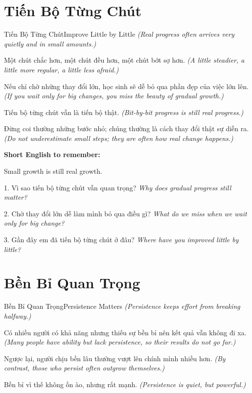 \section{Tiến Bộ Từng Chút}
\begin{truyen}{Tiến Bộ Từng Chút}{Improve Little by Little}
\textit{(Real progress often arrives very quietly and in small amounts.)}

Một chút chắc hơn, một chút đều hơn, một chút bớt sợ hơn.
\textit{(A little steadier, a little more regular, a little less afraid.)}

Nếu chỉ chờ những thay đổi lớn, học sinh sẽ dễ bỏ qua phần đẹp của việc lớn lên.
\textit{(If you wait only for big changes, you miss the beauty of gradual growth.)}

Tiến bộ từng chút vẫn là tiến bộ thật.
\textit{(Bit-by-bit progress is still real progress.)}
\end{truyen}

\begin{baihoc}
Đừng coi thường những bước nhỏ; chúng thường là cách thay đổi thật sự diễn ra.
\textit{(Do not underestimate small steps; they are often how real change happens.)}
\end{baihoc}

\begin{ghinhoanh}
\textbf{Short English to remember:}

Small growth is still real growth.

\end{ghinhoanh}

\begin{tuhocnhanh}
1. Vì sao tiến bộ từng chút vẫn quan trọng? \textit{Why does gradual progress still matter?}

2. Chờ thay đổi lớn dễ làm mình bỏ qua điều gì? \textit{What do we miss when we wait only for big change?}

3. Gần đây em đã tiến bộ từng chút ở đâu? \textit{Where have you improved little by little?}
\end{tuhocnhanh}
\ngancach

\section{Bền Bỉ Quan Trọng}
\begin{truyen}{Bền Bỉ Quan Trọng}{Persistence Matters}
\textit{(Persistence keeps effort from breaking halfway.)}

Có nhiều người có khả năng nhưng thiếu sự bền bỉ nên kết quả vẫn không đi xa.
\textit{(Many people have ability but lack persistence, so their results do not go far.)}

Ngược lại, người chịu bền lâu thường vượt lên chính mình nhiều hơn.
\textit{(By contrast, those who persist often outgrow themselves.)}

Bền bỉ vì thế không ồn ào, nhưng rất mạnh.
\textit{(Persistence is quiet, but powerful.)}
\end{truyen}

